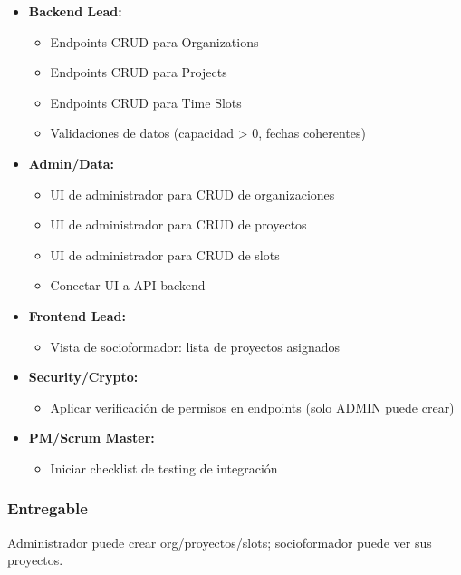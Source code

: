 \documentclass[12pt,a4paper]{article}
\begin{document}
\begin{itemize}[leftmargin=*]
    \item \textbf{Backend Lead:}
    \begin{itemize}
        \item Endpoints CRUD para Organizations
        \item Endpoints CRUD para Projects
        \item Endpoints CRUD para Time Slots
        \item Validaciones de datos (capacidad > 0, fechas coherentes)
    \end{itemize}
    
    \item \textbf{Admin/Data:}
    \begin{itemize}
        \item UI de administrador para CRUD de organizaciones
        \item UI de administrador para CRUD de proyectos
        \item UI de administrador para CRUD de slots
        \item Conectar UI a API backend
    \end{itemize}
    
    \item \textbf{Frontend Lead:}
    \begin{itemize}
        \item Vista de socioformador: lista de proyectos asignados
    \end{itemize}
    
    \item \textbf{Security/Crypto:}
    \begin{itemize}
        \item Aplicar verificación de permisos en endpoints (solo ADMIN puede crear)
    \end{itemize}
    
    \item \textbf{PM/Scrum Master:}
    \begin{itemize}
        \item Iniciar checklist de testing de integración
    \end{itemize}
\end{itemize}

\subsubsection{Entregable}
Administrador puede crear org/proyectos/slots; socioformador puede ver sus proyectos.
\end{document}
